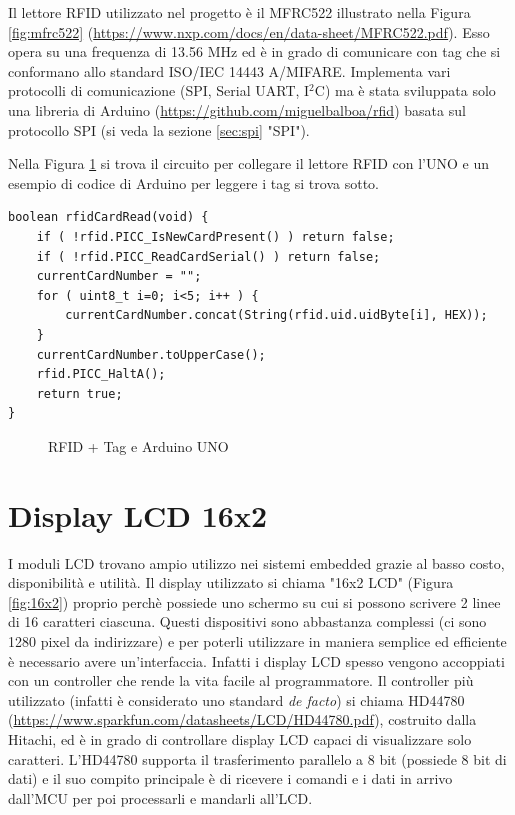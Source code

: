 \documentclass[12pt]{report}
\begin{document}
Il lettore RFID utilizzato nel progetto è il MFRC522 illustrato nella Figura \ref{fig:mfrc522} (\url{https://www.nxp.com/docs/en/data-sheet/MFRC522.pdf}). Esso opera su una frequenza di 13.56 MHz ed è in grado di comunicare con tag che si conformano allo standard ISO/IEC 14443 A/MIFARE. Implementa vari protocolli di comunicazione (SPI, Serial UART, I$^2$C) ma è stata sviluppata solo una libreria di Arduino (\url{https://github.com/miguelbalboa/rfid}) basata sul protocollo SPI (si veda la sezione \ref{sec:spi} "SPI").

Nella Figura \ref{fig:rfid_uno} si trova il circuito per collegare il lettore RFID con l'UNO e un esempio di codice di Arduino per leggere i tag si trova sotto.

\begin{lstlisting}
boolean rfidCardRead(void) {
	if ( !rfid.PICC_IsNewCardPresent() ) return false;
	if ( !rfid.PICC_ReadCardSerial() ) return false;
	currentCardNumber = "";
	for ( uint8_t i=0; i<5; i++ ) {
		currentCardNumber.concat(String(rfid.uid.uidByte[i], HEX));
	}
	currentCardNumber.toUpperCase();
	rfid.PICC_HaltA(); 
	return true;
}
\end{lstlisting} 

\begin{figure}
	\caption{RFID + Tag e Arduino UNO}
	\label{fig:rfid_uno}
\end{figure}


%
\section{Display LCD 16x2}
%

I moduli LCD trovano ampio utilizzo nei sistemi embedded grazie al basso costo, disponibilità e utilità. Il display utilizzato si chiama "16x2 LCD" (Figura \ref{fig:16x2}) proprio perchè possiede uno schermo su cui si possono scrivere 2 linee di 16 caratteri ciascuna. Questi dispositivi sono abbastanza complessi (ci sono 1280 pixel da indirizzare) e per poterli utilizzare in maniera semplice ed efficiente è necessario avere un'interfaccia. Infatti i display LCD spesso vengono accoppiati con un controller che rende la vita facile al programmatore. Il controller più utilizzato (infatti è considerato uno standard \textit{de facto}) si chiama HD44780 (\url{https://www.sparkfun.com/datasheets/LCD/HD44780.pdf}), costruito dalla Hitachi, ed è in grado di controllare display LCD capaci di visualizzare solo caratteri. L'HD44780 supporta il trasferimento parallelo a 8 bit (possiede 8 bit di dati) e il suo compito principale è di ricevere i comandi e i dati in arrivo dall'MCU per poi processarli
e mandarli all'LCD.
\end{document}
